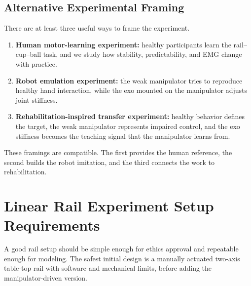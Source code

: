 \documentclass[11pt, a4paper]{article}
\begin{document}
\subsection{Alternative Experimental Framing}

There are at least three useful ways to frame the experiment.

\begin{enumerate}[nosep]
  \item \textbf{Human motor-learning experiment:} healthy participants learn the rail--cup--ball task, and we study how stability, predictability, and EMG change with practice.
  \item \textbf{Robot emulation experiment:} the weak manipulator tries to reproduce healthy hand interaction, while the exo mounted on the manipulator adjusts joint stiffness.
  \item \textbf{Rehabilitation-inspired transfer experiment:} healthy behavior defines the target, the weak manipulator represents impaired control, and the exo stiffness becomes the teaching signal that the manipulator learns from.
\end{enumerate}

These framings are compatible. The first provides the human reference, the second builds the robot imitation, and the third connects the work to rehabilitation.

\section{Linear Rail Experiment Setup Requirements}

A good rail setup should be simple enough for ethics approval and repeatable enough for modeling. The safest initial design is a manually actuated two-axis table-top rail with software and mechanical limits, before adding the manipulator-driven version.
\end{document}
